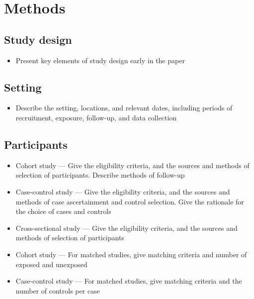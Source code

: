\documentclass[
  letterpaper,
  DIV=11,
  numbers=noendperiod,
  oneside,
  11pt]{scrartcl}
\providecommand{\tightlist}{%
  \setlength{\itemsep}{0pt}\setlength{\parskip}{0pt}}\usepackage{longtable,booktabs,array}
\begin{document}
\newpage{}

\section{Methods}\label{sec-Methods}

\subsection{Study design}\label{study-design}

\begin{itemize}
\tightlist
\item
  Present key elements of study design early in the paper
\end{itemize}

\subsection{Setting}\label{setting}

\begin{itemize}
\tightlist
\item
  Describe the setting, locations, and relevant dates, including periods
  of recruitment, exposure, follow-up, and data collection
\end{itemize}

\subsection{Participants}\label{participants}

\begin{itemize}
\tightlist
\item
  Cohort study --- Give the eligibility criteria, and the sources and
  methods of selection of participants. Describe methods of follow-up
\item
  Case-control study --- Give the eligibility criteria, and the sources
  and methods of case ascertainment and control selection. Give the
  rationale for the choice of cases and controls
\item
  Cross-sectional study --- Give the eligibility criteria, and the
  sources and methods of selection of participants
\item
  Cohort study --- For matched studies, give matching criteria and
  number of exposed and unexposed
\item
  Case-control study --- For matched studies, give matching criteria and
  the number of controls per case
\end{itemize}
\end{document}
